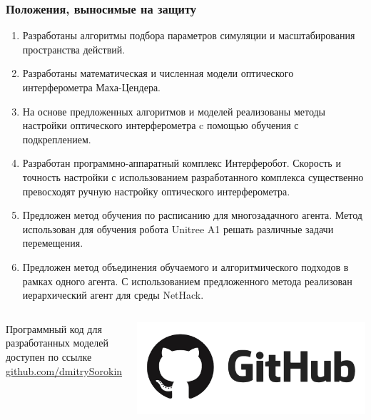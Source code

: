 \begin{frame}[t,allowframebreaks]
\frametitle{Положения, выносимые на защиту}
\begin{enumerate}
\setlength\itemsep{1em}
  \item Разработаны алгоритмы подбора параметров симуляции и масштабирования пространства действий. 
  \item Разработаны математическая и численная модели оптического интерферометра Маха-Цендера. 
  \item На основе предложенных алгоритмов и моделей реализованы методы настройки оптического интерферометра c помощью обучения с подкреплением.
  \item Разработан программно-аппаратный комплекс Интерферобот. Скорость и точность настройки с использованием разработанного комплекса существенно превосходят ручную настройку оптического интерферометра.
  \item Предложен метод обучения по расписанию для многозадачного агента. Метод использован для обучения робота Unitree A1 решать различные задачи перемещения. 
  \item Предложен метод объединения обучаемого и алгоритмического подходов в рамках одного агента. С использованием предложенного метода реализован иерархический агент для среды NetHack.
\end{enumerate}

\vspace{30pt}
\begin{columns}
Программный код для разработанных моделей\\ доступен по ссылке \href{https://github.com/dmitrySorokin}{\color{blue}github.com/dmitrySorokin}

\includegraphics[width=1\linewidth]{Presentation/images/logo/github.png}  

\end{columns}

\end{frame}

